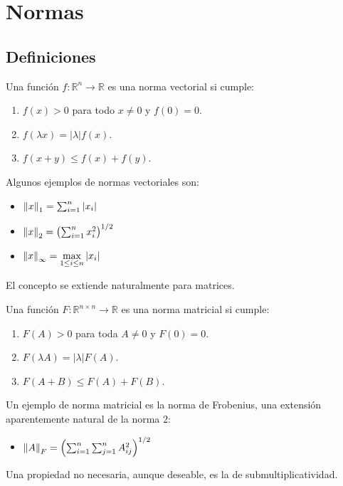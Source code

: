 \section{Normas}

\subsection{Definiciones}

\begin{defi}
Una función $f : \mathbb{R}^n \to \mathbb{R}$ es una norma vectorial si cumple:
\begin{enumerate}
\item $f(x) > 0$ para todo $x \neq 0$ y $f(0) = 0$.
\item $f(\lambda x) = |\lambda| f(x)$.
\item $f(x + y) \leq f(x) + f(y)$.
\end{enumerate}
\end{defi}

Algunos ejemplos de normas vectoriales son:
\begin{itemize}
\item $\left\lVert x\right\rVert_1 = \sum_{i = 1}^{n} |x_i|$
\item $\left\lVert x\right\rVert_2 = \left(\sum_{i = 1}^{n} x_i^2\right)^{1/2}$
\item $\left\lVert x\right\rVert_{\infty} = \max\limits_{1 \leq i \leq n}|x_i|$
\end{itemize}

El concepto se extiende naturalmente para matrices.

\begin{defi}
Una función $F : \mathbb{R}^{n \times n} \to \mathbb{R}$ es una norma matricial si cumple:
\begin{enumerate}
\item $F(A) > 0$ para toda $A \neq 0$ y $F(0) = 0$.
\item $F(\lambda A) = |\lambda| F(A)$.
\item $F(A + B) \leq F(A) + F(B)$.
\end{enumerate}
\end{defi}

Un ejemplo de norma matricial es la norma de Frobenius, una extensión aparentemente natural de la norma 2:
\begin{itemize}
\item $\left\lVert A\right\rVert_F = \left(\sum_{i = 1}^{n} \sum_{j = 1}^{n} A_{ij}^2\right)^{1/2}$
\end{itemize}

Una propiedad no necesaria, aunque deseable, es la de submultiplicatividad.

